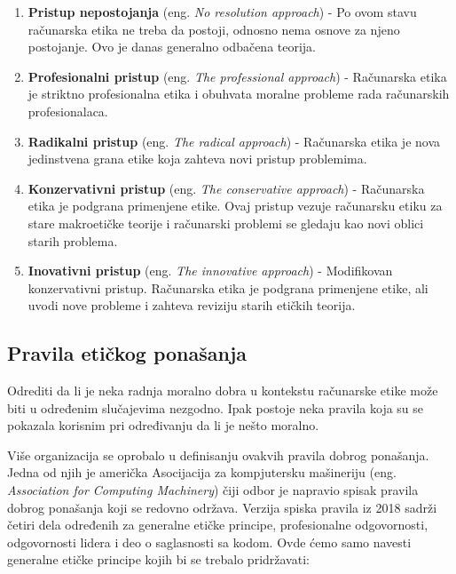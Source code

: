 \documentclass[a4paper]{article}
\begin{document}
\begin{enumerate}
	\item \textbf{Pristup nepostojanja} (eng. \textit{No resolution approach}) - Po ovom stavu računarska etika ne treba da postoji, odnosno nema osnove za njeno postojanje. Ovo je danas generalno odbačena teorija.
	\item \textbf{Profesionalni pristup} (eng. \textit{The professional approach}) - Računarska etika je striktno profesionalna etika i obuhvata moralne probleme rada računarskih profesionalaca.
	\item \textbf{Radikalni pristup} (eng. \textit{The radical approach}) - Računarska etika je nova jedinstvena grana etike koja zahteva novi pristup problemima.
	\item \textbf{Konzervativni pristup} (eng. \textit{The conservative approach}) - Računarska etika je podgrana primenjene etike. Ovaj pristup vezuje računarsku etiku za stare makroetičke teorije i računarski problemi se gledaju kao novi oblici starih problema.
	\item \textbf{Inovativni pristup} (eng. \textit{The innovative approach}) - Modifikovan konzervativni pristup. Računarska etika je podgrana primenjene etike, ali uvodi nove probleme i zahteva reviziju starih etičkih teorija.
\end{enumerate}


\subsection{Pravila etičkog ponašanja}
Odrediti da li je neka radnja moralno dobra u kontekstu računarske etike može biti u određenim slučajevima nezgodno. Ipak postoje neka pravila koja su se pokazala korisnim pri određivanju da li je nešto moralno.

Više organizacija se oprobalo u definisanju ovakvih pravila dobrog ponašanja.
Jedna od njih je američka Asocijacija za kompjutersku mašineriju (eng. \textit{Association for Computing Machinery}) čiji odbor je napravio spisak pravila dobrog ponašanja koji se redovno održava. Verzija spiska pravila iz 2018\cite{acm} sadrži četiri dela određenih za generalne etičke principe, profesionalne odgovornosti, odgovornosti lidera i deo o saglasnosti sa kodom. Ovde ćemo samo navesti generalne etičke principe kojih bi se trebalo pridržavati:
\end{document}
